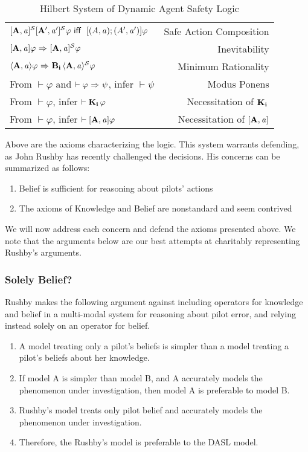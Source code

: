 \begin{table}[H]
\begin{center}
\begin{tabular}{| l r |}
    $\mathbf{[A,\mathit{a}]^\mathcal{S}}\mathbf{[A',\mathit{a}']^\mathcal{S}}\varphi \textsf{\ iff \ } [(A,\mathit{a});(A',\mathit{a}')]\varphi$ & Safe Action Composition \\
    $\mathbf{[A,\mathit{a}]}\varphi {\ \Rightarrow \ } \mathbf{[A,\mathit{a}]^\mathcal{S}}\varphi$ & Inevitability\\
    $\mathbf{\langle A,\mathit{a}\rangle}\varphi {\ \Rightarrow \ } \mathbf{B}_{\mathbf{i}}\,\mathbf{\langle A,\mathit{a}\rangle^\mathcal{S}}\varphi$ & Minimum Rationality\\
    From $\vdash \varphi$ and $\vdash \varphi {\ \Rightarrow \ } \psi$, infer $\vdash\psi$ & Modus Ponens\\
    From $\vdash \varphi$, infer $\vdash \mathbf{K}_{\mathbf{i}}\,\varphi$ & Necessitation of $\mathbf{K}_{\mathbf{i}}\,$\\
    From $\vdash \varphi$, infer $\vdash \mathbf{[A,\mathit{a}]}\varphi$ & Necessitation of $\mathbf{[A,\mathit{a}]}$\\
	\hline
\end{tabular}
\caption{Hilbert System of Dynamic Agent Safety Logic}
\end{center}
\end{table}

Above are the axioms characterizing the logic. This system warrants defending, as John Rushby has recently challenged the decisions. His concerns can be summarized as follows:
\begin{enumerate}
	\item Belief is sufficient for reasoning about pilots' actions
	\item The axioms of Knowledge and Belief are nonstandard and seem contrived
\end{enumerate}
We will now address each concern and defend the axioms presented above. We note that the arguments below are our best attempts at charitably representing Rushby's arguments.

\subsubsection*{Solely Belief?}
Rushby makes the following argument against including operators for knowledge and belief in a multi-modal system for reasoning about pilot error, and relying instead solely on an operator for belief.
\begin{enumerate}
	\item A model treating only a pilot's beliefs is simpler than a model treating a pilot's beliefs about her knowledge.
	\item If model A is simpler than model B, and A accurately models the phenomenon under investigation, then model A is preferable to model B.
	\item Rushby's model treats only pilot belief and accurately models the phenomenon under investigation.
	\item Therefore, the Rushby's model is preferable to the DASL model.
\end{enumerate}

